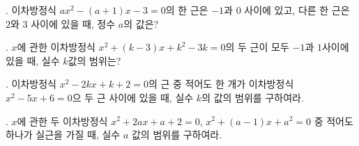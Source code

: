 \documentclass{article}
\begin{document}
.
이차방정식 \(ax^2-(a+1)x-3=0\)의 한 근은 \(-1\)과 \(0\) 사이에 있고, 다른 한 근은 \(2\)와 \(3\) 사이에 있을 때, 정수 \(a\)의 값은?

.
\(x\)에 관한 이차방정식 \(x^2+(k-3)x+k^2-3k=0\)의 두 근이 모두 \(-1\)과 \(1\)사이에 있을 때, 실수 \(k\)값의 범위는?

.
이차방정식 \(x^2-2kx+k+2=0\)의 근 중 적어도 한 개가 이차방정식 \(x^2-5x+6=0\)으 두 근 사이에 있을 때, 실수 \(k\)의 값의 범위를 구하여라.

.
\(x\)에 관한 두 이차방정식 \(x^2+2ax+a+2=0\), \(x^2+(a-1)x+a^2=0\) 중 적어도 하나가 실근을 가질 때, 실수 \(a\) 값의 범위를 구하여라.
\end{document}
